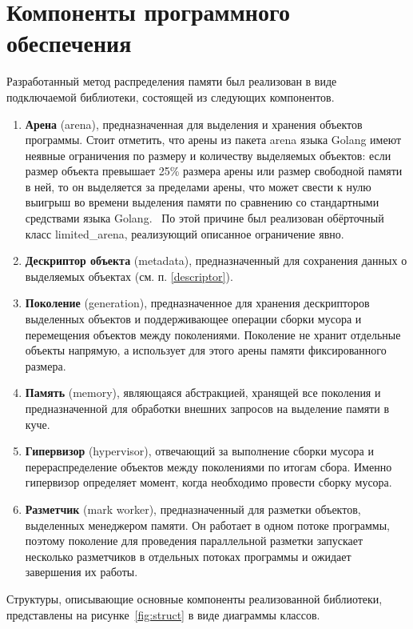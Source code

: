 \section{Компоненты программного обеспечения}

Разработанный метод распределения памяти был реализован в виде подключаемой библиотеки, состоящей из следующих компонентов.

\begin{enumerate}[label*=\arabic*.]
	\item \textbf{Арена} (arena), предназначенная для выделения и хранения объектов программы. Стоит отметить, что арены из пакета arena языка Golang имеют неявные ограничения по размеру и количеству выделяемых объектов: если размер объекта превышает 25\% размера арены или размер свободной памяти в ней, то он выделяется за пределами арены, что может свести к нулю выигрыш во времени выделения памяти по сравнению со стандартными средствами языка Golang.~\cite{golang_arena_limits} По этой причине был реализован обёрточный класс limited\_arena, реализующий описанное ограничение явно. 
	\item \textbf{Дескриптор объекта} (metadata), предназначенный для сохранения данных о выделяемых объектах (см. п. \ref{descriptor}).
	\item \textbf{Поколение} (generation), предназначенное для хранения дескрипторов выделенных объектов и поддерживающее операции сборки мусора и перемещения объектов между поколениями. Поколение не хранит отдельные объекты напрямую, а использует для этого арены памяти фиксированного размера.
	\item \textbf{Память} (memory), являющаяся абстракцией, хранящей все поколения и предназначенной для обработки внешних запросов на выделение памяти в куче.
	\item \textbf{Гипервизор} (hypervisor), отвечающий за выполнение сборки мусора и перераспределение объектов между поколениями по итогам сбора. Именно гипервизор определяет момент, когда необходимо провести сборку мусора.
	\item \textbf{Разметчик} (mark worker), предназначенный для разметки объектов, выделенных менеджером памяти. Он работает в одном потоке программы, поэтому поколение для проведения параллельной разметки запускает несколько разметчиков в отдельных потоках программы и ожидает завершения их работы.
\end{enumerate}

Структуры, описывающие основные компоненты реализованной библиотеки, представлены на рисунке~\ref{fig:struct} в виде диаграммы классов.

